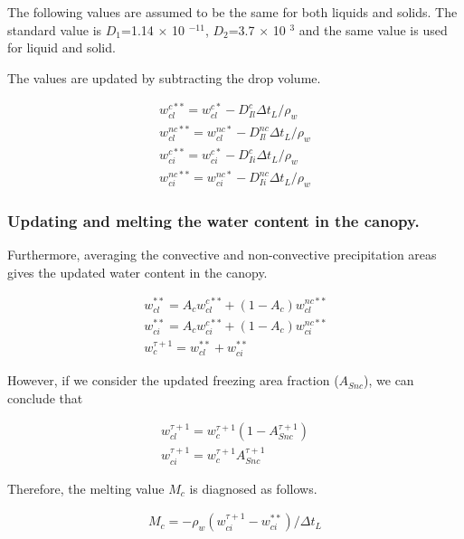 The following values are assumed to be the same for both liquids and
solids. The standard value is \(D_1\)=1.14 \(\times\) 10 \(^{-11}\),
\(D_2\)=3.7 \(\times\) 10 \(^{3}\) and the same value is used for liquid
and solid.

The values are updated by subtracting the drop volume.

\begin{eqnarray}
 w_{cl}^{c**} = w_{cl}^{c*}  - D_{Il}^c    \Delta t_L / \rho_w \\
 w_{cl}^{nc**}= w_{cl}^{nc*} - D_{Il}^{nc} \Delta t_L / \rho_w \\
 w_{ci}^{c**} = w_{ci}^{c*}  - D_{Ii}^c    \Delta t_L / \rho_w \\
 w_{ci}^{nc**}= w_{ci}^{nc*} - D_{Ii}^{nc} \Delta t_L / \rho_w
\end{eqnarray}

\hypertarget{updating-and-melting-the-water-content-in-the-canopy.}{%
\subsubsection{Updating and melting the water content in the
canopy.}\label{updating-and-melting-the-water-content-in-the-canopy.}}

Furthermore, averaging the convective and non-convective precipitation
areas gives the updated water content in the canopy.

\begin{eqnarray}
 w_{cl}^{**} = A_c w_{cl}^{c**} + (1-A_c) w_{cl}^{nc**} \\
 w_{ci}^{**} = A_c w_{ci}^{c**} + (1-A_c) w_{ci}^{nc**} \\
 w_c^{\tau+1} = w_{cl}^{**} + w_{ci}^{**}
\end{eqnarray}

However, if we consider the updated freezing area fraction
(\(A_{Snc}\)), we can conclude that

\begin{eqnarray}
 w_{cl}^{\tau+1} = w_{c}^{\tau+1} (1-A_{Snc}^{\tau+1}) \\
 w_{ci}^{\tau+1} = w_{c}^{\tau+1} A_{Snc}^{\tau+1}
\end{eqnarray}

Therefore, the melting value \(M_c\) is diagnosed as follows.

\begin{eqnarray}
 M_c = - \rho_w ( w_{ci}^{\tau+1} - w_{ci}^{**} ) / \Delta t_L
\end{eqnarray}

